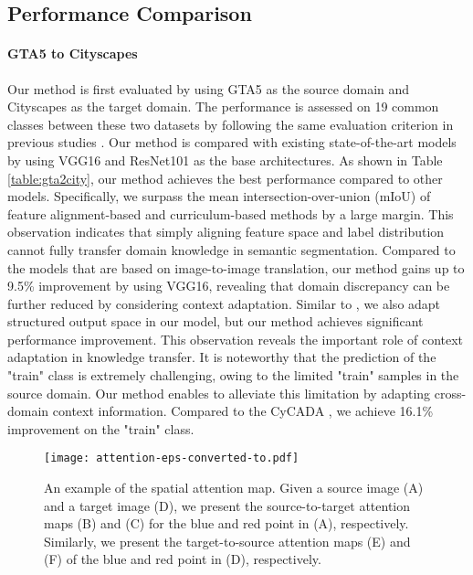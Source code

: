 \documentclass[10pt,twocolumn,letterpaper]{article}
\begin{document}
	\subsection{Performance Comparison}
	\paragraph{GTA5 to Cityscapes}

	Our method is first evaluated by using GTA5 as the source domain and Cityscapes as the target domain. The performance is assessed on 19 common classes between these two datasets by following the same evaluation criterion in previous studies \cite{li2019bidirectional, chen2019crdoco}. Our method is compared with existing state-of-the-art models by using VGG16 and ResNet101 as the base architectures. As shown in Table \ref{table:gta2city}, our method achieves the best performance compared to other models. Specifically, we surpass the mean intersection-over-union (mIoU) of feature alignment-based \cite{hoffman2016fcns, sankaranarayanan2018learning, luo2019taking} and curriculum-based methods \cite{zhang2017curriculum} by a large margin. This observation indicates that simply aligning feature space and label distribution cannot fully transfer domain knowledge in semantic segmentation. Compared to the models \cite{hoffman2017cycada, chen2019crdoco, li2019bidirectional} that are based on image-to-image translation, our method gains up to 9.5\% improvement by using VGG16, revealing that domain discrepancy can be further reduced by considering context adaptation. Similar to \cite{tsai2018learning, li2019bidirectional}, we also adapt structured output space in our model, but our method achieves significant performance improvement. This observation reveals the important role of context adaptation in knowledge transfer. It is noteworthy that the prediction of the "train" class is extremely challenging, owing to the limited "train" samples in the source domain. Our method enables to alleviate this limitation by adapting cross-domain context information. Compared to the CyCADA \cite{hoffman2017cycada}, we achieve 16.1\% improvement on the "train" class.

	\begin{figure}[t]
		\begin{center}
			\texttt{[image: attention-eps-converted-to.pdf]}
		\end{center}
		\caption{An example of the spatial attention map. Given a source image (A) and a target image (D), we present the source-to-target attention maps (B) and (C) for the blue and red point in (A), respectively. Similarly, we present the target-to-source attention maps (E) and (F) of the blue and red point in (D), respectively. }
		\label{fig:spatial_attention_map}
		\vspace{-0.2in}
	\end{figure}
\end{document}
